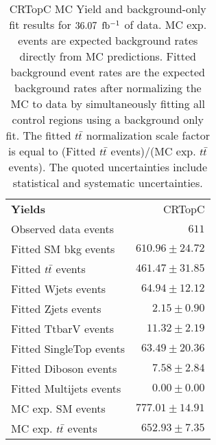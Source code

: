 

\begin{table}[h!]
\caption[CRTopC MC Yield and background-only fit results for $\intlumi$ $\ifb$ of data]{CRTopC MC Yield and background-only fit results for $\intlumi$ $\ifb$ of data. MC exp. events are expected background rates directly from MC predictions.  Fitted background event rates are the expected background rates after normalizing the MC to data by simultaneously fitting all control regions using a background only fit.  The fitted $t\bar{t}$ normalization scale factor is equal to (Fitted $t\bar{t}$ events)/(MC exp. $t\bar{t}$ events). The quoted uncertainties include statistical and systematic uncertainties. }
\label{table.bkgonly.CRTopC}
\begin{center}
\setlength{\tabcolsep}{0.0pc}
{\small
\begin{tabular*}{\textwidth}{@{\extracolsep{\fill}}lr}
\noalign{\smallskip}\hline\noalign{\smallskip}
{\bf Yields}           & CRTopC                  \\[-0.05cm]
\noalign{\smallskip}\hline\noalign{\smallskip}
Observed data events          & $611$                       \\
\noalign{\smallskip}\hline\noalign{\smallskip}
Fitted SM bkg events         & $610.96 \pm 24.72$                     \\
\noalign{\smallskip}\hline\noalign{\smallskip}
        Fitted $t\bar{t}$ events         & $461.47 \pm 31.85$                 \\
        Fitted Wjets events         & $64.94 \pm 12.12$                    \\
        Fitted Zjets events         & $2.15 \pm 0.90$                \\
        Fitted TtbarV events         & $11.32 \pm 2.19$                    \\
        Fitted SingleTop events         & $63.49 \pm 20.36$                   \\
        Fitted Diboson events         & $7.58 \pm 2.84$                       \\
        Fitted Multijets events         & $0.00 \pm 0.00$                    \\
 \noalign{\smallskip}\hline\noalign{\smallskip}
MC exp. SM events              & $777.01 \pm 14.91$                   \\
\noalign{\smallskip}\hline\noalign{\smallskip}
        MC exp. $t\bar{t}$ events         & $652.93 \pm 7.35$                     \\

\end{tabular*}}
\end{center}
\end{table}
